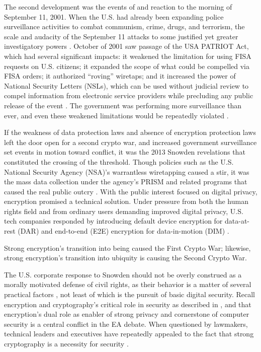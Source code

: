 The second development was the events of and reaction to the morning of September 11, 2001. When the U.S. had already
been expanding police surveillance activities to combat communism, crime, drugs, and terrorism, the scale and audacity
of the September 11 attacks to some justified yet greater investigatory powers \cite{bloss_escalating_2007}. October of
2001 saw passage of the USA PATRIOT Act, which had several significant impacts: it weakened the limitation for using
FISA requests on U.S. citizens; it expanded the scope of what could be compelled via FISA orders; it authorized
``roving'' wiretaps; and it increased the power of National Security Letters (NSLs), which can be used without judicial
review to compel information from electronic service providers while precluding any public release of the event
\cite{sensenbrenner_2001} \cite{shamsi_2011}. The government was performing more surveillance than ever, and even these
weakened limitations would be repeatedly violated \cite{shamsi_2011} \cite{tucker_2020}.

If the weakness of data protection laws and absence of encryption protection laws left the door open for a second crypto
war, and increased government surveillance set events in motion toward conflict, it was the 2013 Snowden revelations
that constituted the crossing of the threshold. Though policies such as the U.S. National Security Agency (NSA)'s
warrantless wiretapping caused a stir, it was the mass data collection under the agency's PRISM and related programs
that caused the real public outcry \cite{landau_making_2013}. With the public interest focused on digital privacy,
encryption promised a technical solution. Under pressure from both the human rights field and from ordinary users
demanding improved digital privacy, U.S. tech companies responded by introducing default device encryption for
data-at-rest (DAR) and end-to-end (E2E) encryption for data-in-motion (DIM) \cite{treguer_us_2018}.

Strong encryption's transition into being caused the First Crypto War; likewise, strong encryption's transition into
ubiquity is causing the Second Crypto War.

The U.S. corporate response to Snowden should not be overly construed as a morally motivated defense of civil rights, as
their behavior is a matter of several practical factors \cite{treguer_us_2018}, not least of which is the pursuit of
basic digital security. Recall encryption and cryptography's critical role in security as described in
, and that encryption's dual role as enabler of strong privacy and cornerstone of computer
security is a central conflict in the EA debate. When questioned by lawmakers, technical leaders and
executives have repeatedly appealed to the fact that strong cryptography is a necessity for security
\cite{schulze_clipper_2017}.

